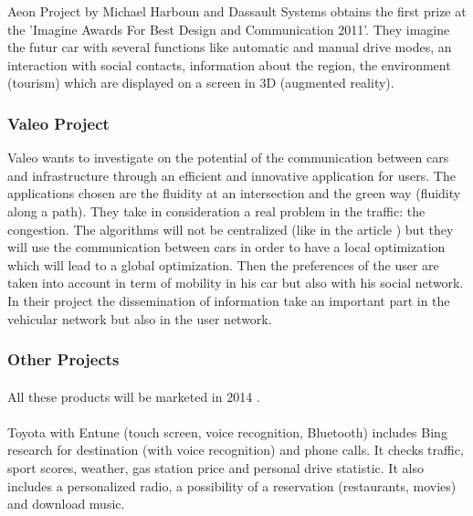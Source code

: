 \documentclass[a4paper]{article}
\begin{document}
Aeon Project by Michael Harboun and Dassault Systems obtains the first prize at the 'Imagine Awards For Best Design and Communication 2011'. They imagine the futur car with several functions like automatic and manual drive modes, an interaction with social contacts, information about the region, the environment (tourism) which are displayed on a screen in 3D (augmented reality).

\subsubsection{Valeo Project}
\label{Valeo}

Valeo wants to investigate on the potential of the communication between cars and infrastructure through an efficient and innovative application for users. The applications chosen are the fluidity at an intersection and the green way (fluidity along a path). They take in consideration a real problem in the traffic: the congestion. The algorithms will not be centralized (like in the article \cite{algo}) but they will use the communication between cars in order to have a local optimization which will lead to a global optimization. Then the preferences of the user are taken into account in term of mobility in his car but also with his social network. In their project the dissemination of information take an important part in the vehicular network but also in the user network.

\subsubsection{Other Projects}
\paragraph{}
All these products will be marketed in 2014 \cite{logo}. 
\paragraph{}
Toyota with Entune (touch screen, voice recognition, Bluetooth) includes Bing research for destination (with voice recognition) and phone calls. It checks traffic, sport scores, weather, gas station price and personal drive statistic. It also includes a personalized radio, a possibility of a reservation (restaurants, movies) and download music.
\end{document}
